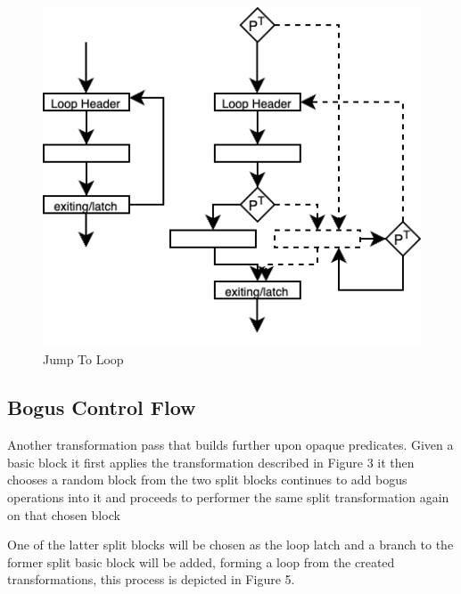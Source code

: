 \begin{figure}
  \includegraphics[width=1\textwidth]{./images/jump-to-loop.png}
  \caption{Jump To Loop}
\end{figure}

\subsection{Bogus Control Flow}

Another transformation pass that builds further upon opaque predicates. Given a basic block it first
applies the transformation described in Figure 3 it then chooses a random block from the two split blocks
continues to add bogus operations into it and proceeds to performer the same split transformation again on that chosen block

One of the latter split blocks will be chosen as the loop latch and a branch to the former split basic block will be added,
forming a loop from the created transformations, this process is depicted in Figure 5.

